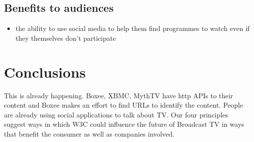 \documentclass[]{article}%
\begin{document}
\subsection{Benefits to audiences}

\begin{itemize}
\item{the ability to use social media to help them find programmes to watch even if they themselves don't participate}
\end{itemize}


\section{Conclusions}

This is already happening. Boxee, XBMC, MythTV have http APIs to their content and Boxee makes an effort to find URLs to identify the content. People are already using social applications to talk about TV. Our four principles suggest ways in which W3C could influence the future of Broadcast TV in ways that benefit the consumer as well as companies involved.
\end{document}
